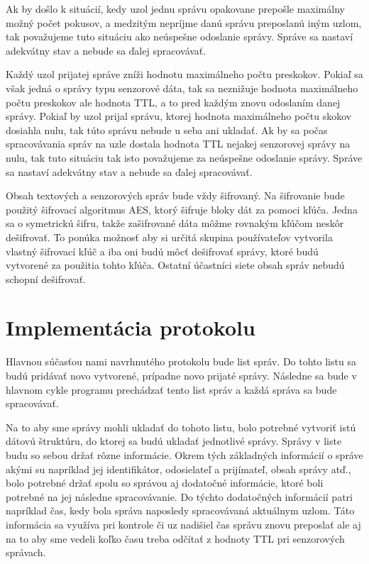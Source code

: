 \documentclass[slovak,master]{diploma}
\begin{document}
Ak by došlo k situácií, kedy uzol jednu správu opakovane prepošle maximálny možný počet pokusov, a medzitým nepríjme danú správu preposlanú iným uzlom, 
tak považujeme tuto situáciu ako neúspešne odoslanie správy. Správe sa nastaví adekvátny stav a nebude sa ďalej spracovávať.

Každý uzol prijatej správe zníži hodnotu maximálneho počtu preskokov. Pokiaľ sa však jedná o správy typu senzorové dáta, tak sa neznižuje hodnota maximálneho počtu preskokov 
ale hodnota TTL, a to pred každým znovu odoslaním danej správy. Pokiaľ by uzol prijal správu, ktorej hodnota maximálneho počtu skokov dosiahla nulu, tak túto 
správu nebude u seba ani ukladať. Ak by sa počas spracovávania správ na uzle dostala hodnota TTL nejakej senzorovej správy na nulu, tak tuto situáciu tak isto považujeme 
za neúspešne odoslanie správy. Správe sa nastaví adekvátny stav a nebude sa ďalej spracovávať.

Obsah textových a senzorových správ bude vždy šifrovaný. Na šifrovanie bude použitý šifrovací algoritmus AES, ktorý šifruje bloky dát za pomoci kľúča.
Jedna sa o symetrickú šifru, takže zašifrované dáta môžme rovnakým kľúčom neskôr dešifrovať. To ponúka možnosť aby si určitá skupina používateľov vytvorila vlastný 
šifrovací kľúč a iba oni budú môcť dešifrovať správy, ktoré budú vytvorené za použitia tohto kľúča. Ostatní účastníci siete obsah správ nebudú schopní dešifrovať.

\section{Implementácia protokolu}
Hlavnou súčasťou nami navrhnutého protokolu bude list správ. Do tohto listu sa budú pridávať novo vytvorené, 
prípadne novo prijaté správy. Následne sa bude v hlavnom cykle programu prechádzať tento list správ a každá správa sa bude spracovávať.

Na to aby sme správy mohli ukladať do tohoto listu, bolo potrebné vytvoriť istú dátovú štruktúru, do ktorej sa budú ukladať jednotlivé správy.
Správy v liste budu so sebou držať rôzne informácie. Okrem tých základných informácií o správe akými su napríklad jej identifikátor, odosielateľ a prijímateľ, obsah správy atď., 
bolo potrebné držať spolu so správou aj dodatočné informácie, ktoré boli potrebné na jej následne spracovávanie. Do týchto dodatočných informácií patri napríklad 
čas, kedy bola správa naposledy spracovávaná aktuálnym uzlom. Táto informácia sa využíva pri kontrole či uz nadišiel čas správu znovu preposlať ale aj 
na to aby sme vedeli koľko času treba odčítať z hodnoty TTL pri senzorových správach.
\end{document}
